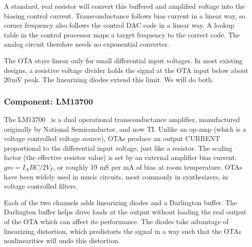 \documentclass[11pt, letterpaper,titlepage]{article}
\begin{document}
A standard, real resistor will convert this buffered and amplified voltage into the biasing control current.
Transconductance follows bias current in a linear way, so corner frequency also
follows the control DAC code in a linear way. A lookup table in the control
processor maps a target frequency to the correct code. The analog circuit
therefore needs no exponential converter.

The OTA stays linear only for small differential input voltages. In most existing designs, a resistive voltage
divider holds the signal at the OTA input below about 20\,mV peak. The
linearizing diodes extend this limit. We will do both.



\subsubsection*{Component: LM13700}

\label{sssec:vcr}

The LM13700~\cite{lm13700} is a dual operational transconductance amplifier, manufactured originally by National Semiconductor, and now TI. Unlike an op-amp (which is a voltage controlled voltage source), OTAs produce an output CURRENT proportional to the differential input voltage, just like a resistor. The scaling factor (the effective resistor value) is set by an external amplifier bias current: $gm = I_ABC / 2V_T$, or roughly 19 mS per mA of bias at room temperature. OTAs have been widely used in music circuits, most commonly in synthesizers, in voltage controlled filters.

Each of the two channels adds linearizing diodes and a Darlington buffer. The Darlington buffer helps drive loads at the output without loading the real output of the OTA which can affect its performance. The
diodes take advantage of linearizing distortion, which predistorts the signal in a way such that the OTAs nonlinearities will undo this distortion.
\end{document}
